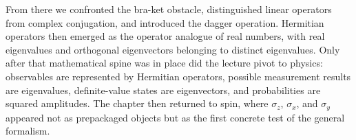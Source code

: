 From there we confronted the bra-ket obstacle, distinguished linear operators from complex conjugation, and introduced the dagger operation. Hermitian operators then emerged as the operator analogue of real numbers, with real eigenvalues and orthogonal eigenvectors belonging to distinct eigenvalues. Only after that mathematical spine was in place did the lecture pivot to physics: observables are represented by Hermitian operators, possible measurement results are eigenvalues, definite-value states are eigenvectors, and probabilities are squared amplitudes. The chapter then returned to spin, where \(\sigma_z\), \(\sigma_x\), and \(\sigma_y\) appeared not as prepackaged objects but as the first concrete test of the general formalism.